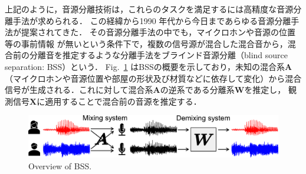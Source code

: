 上記のように，音源分離技術は，これらのタスクを満足するには高精度な音源分離手法が求められる．
この経緯から1990 年代から今日まであらゆる音源分離手法が提案されてきた．
その音源分離手法の中でも，マイクロホンや音源の位置等の事前情報
が無いという条件下で，複数の信号源が混合した混合音から，混合前の分離音を推定するような分離手法をブラインド音源分離（blind source separation: BSS）\cite{BSS}という．
Fig.~\ref{fig:bss} はBSSの概要を示しており，未知の混合系$\bm{A}$（マイクロホンや音源位置や部屋の形状及び材質などに依存して変化）から混合信号が生成される．これに対して混合系$\bm{A}$の逆系である分離系$\bm{W}$を推定し，
観測信号$\bm{X}$に適用することで混合前の音源を推定する．
\begin{figure}[t]
    \vspace{4pt}
    \begin{center}
        \includegraphics[width=0.9\columnwidth]{figures/BSS.pdf}
    \end{center}
    \vspace{-8pt}
	\caption{Overview of BSS.}
	\label{fig:bss}
\end{figure}

